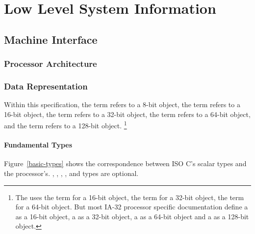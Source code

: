 \chapter{Low Level System Information}

\section{Machine Interface}

\subsection{Processor Architecture}

\subsection{Data Representation}

Within this specification, the term \emph{\textindex{\byte{}}} refers to
a 8-bit object, the term \emph{\textindex{\twobyte{}}} refers to a 16-bit
object, the term \emph{\textindex{\fourbyte{}}} refers to a 32-bit
object, the term \emph{\textindex{\eightbyte{}}} refers to a 64-bit
object, and the term \emph{\textindex{\sixteenbyte{}}} refers to a
128-bit object.%
\footnote{The \intelabi uses the term \emph{} for
  a 16-bit object, the term \emph{} for a 32-bit
  object, the term \emph{} for a 64-bit object.  But
  most IA-32 processor specific documentation define a
  \emph{} as a 16-bit object, a
  \emph{} as a 32-bit object, a
  \emph{} as a 64-bit object and a
  \emph{} as a 128-bit object.}

\subsubsection{Fundamental Types}

Figure~\ref{basic-types} shows the correspondence between ISO C's
scalar types and the processor's.  , ,
, ,  and  types are
optional.

